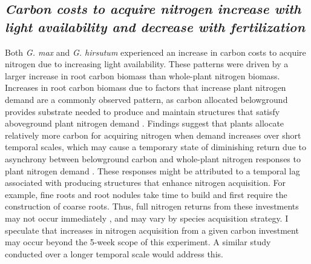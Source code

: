 \subsection{\textit{Carbon costs to acquire nitrogen increase with light availability and decrease with fertilization}}
Both \textit{G. max} and \textit{G. hirsutum} experienced an increase in carbon costs to acquire nitrogen due to increasing light availability. These patterns were driven by a larger increase in root carbon biomass than whole-plant nitrogen biomass. Increases in root carbon biomass due to factors that increase plant nitrogen demand are a commonly observed pattern, as carbon allocated belowground provides substrate needed to produce and maintain structures that satisfy aboveground plant nitrogen demand . Findings suggest that plants allocate relatively more carbon for acquiring nitrogen when demand increases over short temporal scales, which may cause a temporary state of diminishing return due to asynchrony between belowground carbon and whole-plant nitrogen responses to plant nitrogen demand . These responses might be attributed to a temporal lag associated with producing structures that enhance nitrogen acquisition. For example, fine roots  and root nodules  take time to build and first require the construction of coarse roots. Thus, full nitrogen returns from these investments may not occur immediately , and may vary by species acquisition strategy. I speculate that increases in nitrogen acquisition from a given carbon investment may occur beyond the 5-week scope of this experiment. A similar study conducted over a longer temporal scale would address this.

